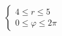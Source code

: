\documentclass[preview]{standalone}
\begin{document}
\begin{align*}
\left\{ \begin{array}{l}4 \leq r \leq 5 \\0 \leq \varphi \leq 2\pi\end{array} \right.
\end{align*}
\end{document}
